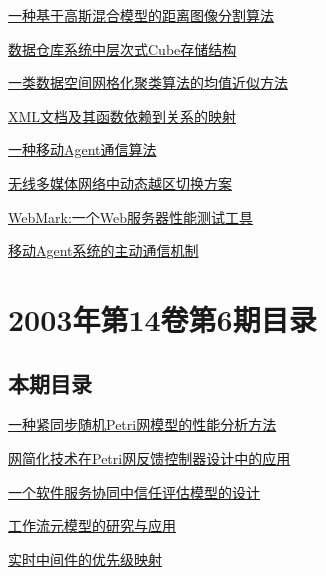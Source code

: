 \documentclass[a4paper]{article}
\begin{document}
\href{http://www.jos.org.cn/ch/reader/download_pdf.aspx?file_no=20030709&year_id=2003&quarter_id=7&falg=1}{一种基于高斯混合模型的距离图像分割算法}

\href{http://www.jos.org.cn/ch/reader/download_pdf.aspx?file_no=20030710&year_id=2003&quarter_id=7&falg=1}{数据仓库系统中层次式Cube存储结构}

\href{http://www.jos.org.cn/ch/reader/download_pdf.aspx?file_no=20030711&year_id=2003&quarter_id=7&falg=1}{一类数据空间网格化聚类算法的均值近似方法}

\href{http://www.jos.org.cn/ch/reader/download_pdf.aspx?file_no=20030712&year_id=2003&quarter_id=7&falg=1}{XML文档及其函数依赖到关系的映射}

\href{http://www.jos.org.cn/ch/reader/download_pdf.aspx?file_no=20030714&year_id=2003&quarter_id=7&falg=1}{一种移动Agent通信算法}

\href{http://www.jos.org.cn/ch/reader/download_pdf.aspx?file_no=20030716&year_id=2003&quarter_id=7&falg=1}{无线多媒体网络中动态越区切换方案}

\href{http://www.jos.org.cn/ch/reader/download_pdf.aspx?file_no=20030717&year_id=2003&quarter_id=7&falg=1}{WebMark:一个Web服务器性能测试工具}

\href{http://www.jos.org.cn/ch/reader/download_pdf.aspx?file_no=20030719&year_id=2003&quarter_id=7&falg=1}{移动Agent系统的主动通信机制}


\section{\textbf{2003年第14卷第6期目录}}
\subsection{本期目录}
\href{http://www.jos.org.cn/ch/reader/download_pdf.aspx?file_no=20030601&year_id=2003&quarter_id=6&falg=1}{一种紧同步随机Petri网模型的性能分析方法}

\href{http://www.jos.org.cn/ch/reader/download_pdf.aspx?file_no=20030602&year_id=2003&quarter_id=6&falg=1}{网简化技术在Petri网反馈控制器设计中的应用}

\href{http://www.jos.org.cn/ch/reader/download_pdf.aspx?file_no=20030603&year_id=2003&quarter_id=6&falg=1}{一个软件服务协同中信任评估模型的设计}

\href{http://www.jos.org.cn/ch/reader/download_pdf.aspx?file_no=20030604&year_id=2003&quarter_id=6&falg=1}{工作流元模型的研究与应用}

\href{http://www.jos.org.cn/ch/reader/download_pdf.aspx?file_no=20030605&year_id=2003&quarter_id=6&falg=1}{实时中间件的优先级映射}
\end{document}

